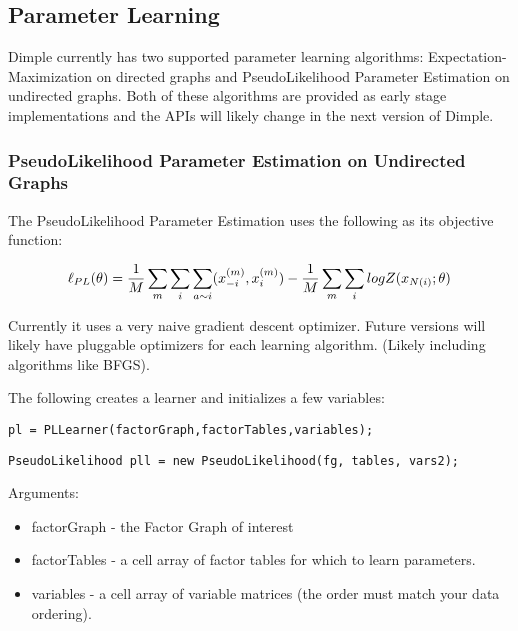 \subsection{Parameter Learning}

Dimple currently has two supported parameter learning algorithms: Expectation-Maximization on directed graphs and PseudoLikelihood Parameter Estimation on undirected graphs.  Both of these algorithms are provided as early stage implementations and the APIs will likely change in the next version of Dimple.

\subsubsection{PseudoLikelihood Parameter Estimation on Undirected Graphs}

The PseudoLikelihood Parameter Estimation uses the following as its objective function:

\[
\ell_{PL}(\theta) = \frac{1}{M}\sum_m \sum_i \sum_{a \sim  i} (x_{-i}^{(m)},x_i^{(m)}) - \\
\frac{1}{M} \sum_m \sum_i log Z(x_{N(i)};\theta)
\]

Currently it uses a very naive gradient descent optimizer.  Future versions will likely have pluggable optimizers for each learning algorithm.  (Likely including algorithms like BFGS).


The following creates a learner and initializes a few variables:

\ifmatlab
\begin{lstlisting}
pl = PLLearner(factorGraph,factorTables,variables);
\end{lstlisting}
\fi

\ifjava
\begin{lstlisting}
PseudoLikelihood pll = new PseudoLikelihood(fg, tables, vars2);
\end{lstlisting}
\fi

Arguments:

\ifmatlab
\begin{itemize}
\item factorGraph - the Factor Graph of interest
\item factorTables - a cell array of factor tables for which to learn parameters.
\item variables - a cell array of variable matrices (the order must match your data ordering).
\end{itemize}
\fi

